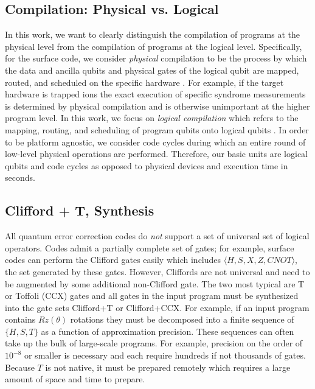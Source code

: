 \subsection{Compilation: Physical vs. Logical}
In this work, we want to clearly distinguish the compilation of programs at the physical level from the compilation of programs at the logical level. Specifically, for the surface code, we consider \textit{physical} compilation to be the process by which the data and ancilla qubits and physical gates of the logical qubit are mapped, routed, and scheduled on the specific hardware \cite{wu2021mapping, viszlai2023architecture, leblond2023tiscc}. For example, if the target hardware is trapped ions the exact execution of specific syndrome measurements is determined by physical compilation and is otherwise unimportant at the higher program level. In this work, we focus on \textit{logical compilation} which refers to the mapping, routing, and scheduling of program qubits onto logical qubits \cite{hua2021autobraid, litinski2019game, litinski2019magic}. In order to be platform agnostic, we consider code cycles during which an entire round of low-level physical operations are performed. Therefore, our basic units are logical qubits and code cycles as opposed to physical devices and execution time in seconds. %

\subsection{Clifford + T, Synthesis}
All quantum error correction codes do \textit{not} support a set of universal set of logical operators. Codes admit a partially complete set of gates; for example, surface codes can perform the Clifford gates easily which includes $\langle H, S, X, Z, CNOT \rangle$, the set generated by these gates. However, Cliffords are not universal and need to be augmented by some additional non-Clifford gate. The two most typical are T or Toffoli (CCX) gates and all gates in the input program must be synthesized into the gate sets Clifford+T or Clifford+CCX. For example, if an input program contains $Rz(\theta)$ rotations they must be decomposed into a finite sequence of $\{H, S, T\}$ as a function of approximation precision. These sequences can often take up the bulk of large-scale programs. For example, precision on the order of $10^{-8}$ or smaller is necessary and each require hundreds if not thousands of gates. Because $T$ is not native, it must be prepared remotely which requires a large amount of space and time to prepare.

